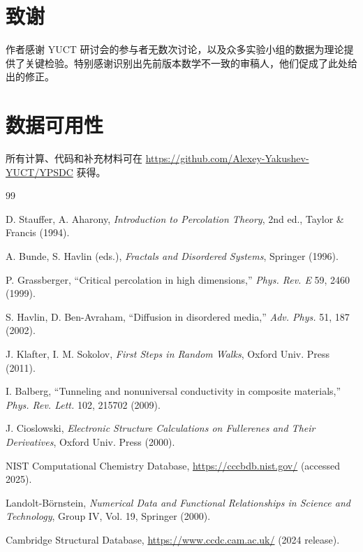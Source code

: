 \documentclass[11pt,a4paper]{article}
\begin{document}
	\section*{致谢}
	
	作者感谢 YUCT 研讨会的参与者无数次讨论，以及众多实验小组的数据为理论提供了关键检验。特别感谢识别出先前版本数学不一致的审稿人，他们促成了此处给出的修正。
	
	\section*{数据可用性}
	
	所有计算、代码和补充材料可在 \url{https://github.com/Alexey-Yakushev-YUCT/YPSDC} 获得。
	
	\begin{thebibliography}{99}
		
		
		D. Stauffer, A. Aharony, \emph{Introduction to Percolation Theory}, 2nd ed., Taylor \& Francis (1994).
		
		A. Bunde, S. Havlin (eds.), \emph{Fractals and Disordered Systems}, Springer (1996).
		
		P. Grassberger, ``Critical percolation in high dimensions,'' \emph{Phys. Rev. E} 59, 2460 (1999).
		
		S. Havlin, D. Ben-Avraham, ``Diffusion in disordered media,'' \emph{Adv. Phys.} 51, 187 (2002).
		
		J. Klafter, I. M. Sokolov, \emph{First Steps in Random Walks}, Oxford Univ. Press (2011).
		
		I. Balberg, ``Tunneling and nonuniversal conductivity in composite materials,'' \emph{Phys. Rev. Lett.} 102, 215702 (2009).
		
		J. Cioslowski, \emph{Electronic Structure Calculations on Fullerenes and Their Derivatives}, Oxford Univ. Press (2000).
		
		NIST Computational Chemistry Database, \url{https://cccbdb.nist.gov/} (accessed 2025).
		
		Landolt-Börnstein, \emph{Numerical Data and Functional Relationships in Science and Technology}, Group IV, Vol. 19, Springer (2000).
		
		Cambridge Structural Database, \url{https://www.ccdc.cam.ac.uk/} (2024 release).
		

\end{thebibliography}
\end{document}

